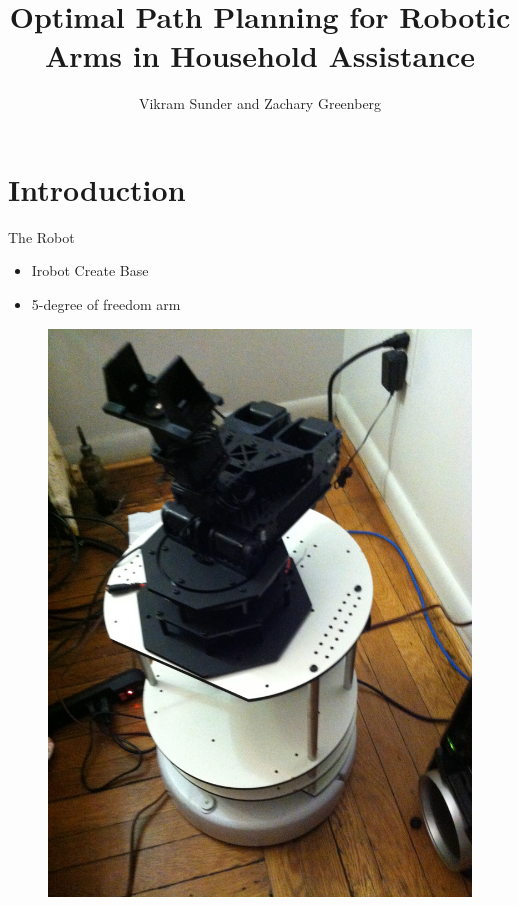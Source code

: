 \documentclass{beamer}
\title{Optimal Path Planning for Robotic Arms in Household Assistance}
\author{Vikram Sunder and Zachary Greenberg}
\begin{document}
\begin{frame}
\maketitle
\end{frame}

\section{Introduction}
\begin{frame}{The Robot}
\begin{itemize}
\item Irobot Create Base\\
\item 5-degree of freedom arm
\end{itemize}
\begin{figure}[htb]
\centering
\includegraphics[scale=.05]{PathPics/Robot_With_Arm.jpg}
\end{figure}
\end{frame}
\end{document}
